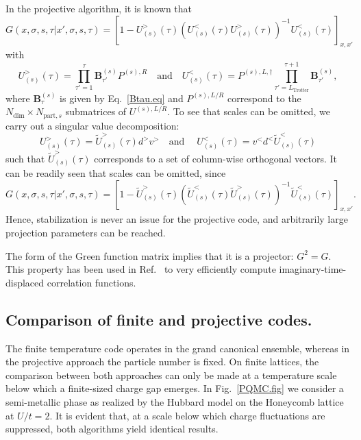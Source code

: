 In the projective algorithm, it is known \cite{Assaad08_rev} that 
\begin{equation}\label{eqn:GreenT0_eq}
G(x,\sigma,s,\tau| x',\sigma,s,\tau)  =    \left[ 1 -  U^{>}_{(s)}(\tau)  \left(   U^{<}_{(s)}(\tau) U^{>}_{(s)}(\tau)  \right)^{-1}  U^{<}_{(s)}(\tau) \right]_{x,x'}
\end{equation}
with 
\begin{equation}
  U^{>}_{(s)}(\tau)  =    \prod_{\tau'=1}^{\tau} \bm{B}_{\tau'}^{(s)}   P^{(s),R}  \quad \text{and}  \quad 
  U^{<}_{(s)}(\tau)  =    P^{(s),L, \dagger} \prod_{\tau'=L_{\text{Trotter}} }^{\tau+1} \bm{B}_{\tau'}^{(s)} ,
\end{equation} 
where $\bm{B}_{\tau}^{(s)}$ is given by Eq.~\eqref{Btau.eq} and $P^{(s),L/R}$  correspond to the $N_{\mathrm{dim}} \times N_{\mathrm{part},s} $  submatrices of $U^{(s),L/R}$.   To see that scales can be omitted, we carry out a singular value decomposition: 
\begin{equation}
	U^{>}_{(s)}(\tau)  =\tilde{U}^{>}_{(s)}(\tau)   d^{>} v^{>}   \quad \text{and}  \quad \;  U^{<}_{(s)}(\tau)  = v^{<}  d^{<} \tilde{U}^{<}_{(s)}(\tau)   
\end{equation}
such that $ \tilde{U}^{>}_{(s)}(\tau) $ corresponds to a set of column-wise orthogonal vectors. It can be readily seen that scales can be omitted, since
\begin{equation}
G(x,\sigma,s,\tau| x',\sigma,s,\tau)  =    \left[ 1 -  \tilde{U}^{>}_{(s)}(\tau)  \left(   \tilde{U}^{<}_{(s)}(\tau) \tilde{U}^{>}_{(s)}(\tau)  \right)^{-1}  \tilde{U}^{<}_{(s)}(\tau) \right]_{x,x'}.
\end{equation}
Hence, stabilization is never an issue for the projective code, and arbitrarily large projection parameters  can be reached.  
 
The form of the Green function matrix implies that it is a projector: $G^2 = G$.   This property has been used in Ref.~\cite{Feldbach00} to very efficiently compute imaginary-time-displaced correlation functions.  



\subsection{Comparison of finite and projective codes.}
\label{Sec:Compare_T0_T}
The finite temperature code  operates in the grand canonical ensemble, whereas  in the projective   approach  the particle number is fixed.  On finite lattices, the comparison between both approaches can only  be made at a temperature scale below which a finite-sized charge gap  emerges.  In Fig.~\ref{PQMC.fig}  we consider a semi-metallic phase  as realized by    the Hubbard model on the Honeycomb lattice  at $U/t=2$. It is evident that, at a scale below which charge fluctuations are  suppressed, both algorithms yield identical results. 
        
